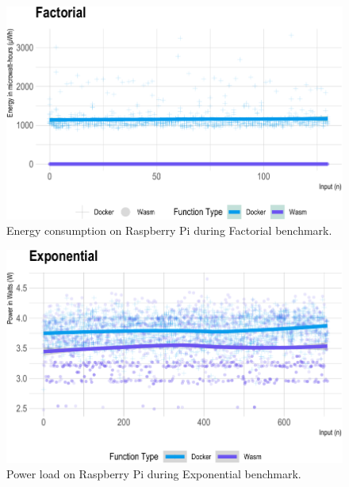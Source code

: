 \documentclass[
  table]{report}
\begin{document}
\begin{figure}[H]

{\centering \includegraphics{thesis_files/figure-latex/fact-energy-1} 

}

\caption{Energy consumption on Raspberry Pi during Factorial benchmark.}\label{fig:fact-energy}
\end{figure}

\newpage

\begin{figure}[H]

{\centering \includegraphics{thesis_files/figure-latex/exp-power-1} 

}

\caption{Power load on Raspberry Pi during Exponential benchmark.}\label{fig:exp-power}
\end{figure}
\end{document}
